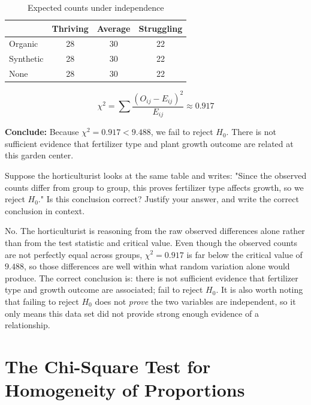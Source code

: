 \begin{Worked}
\begin{Solution}
\begin{table}[H]
\centering
\caption{Expected counts under independence}
\begin{tabular}{l|ccc}
 & Thriving & Average & Struggling \\
\hline
Organic   & 28 & 30 & 22 \\
Synthetic & 28 & 30 & 22 \\
None      & 28 & 30 & 22 \\
\end{tabular}
\end{table}

\[
\chi^2 = \sum \frac{(O_{ij}-E_{ij})^2}{E_{ij}} \approx 0.917
\]

\textbf{Conclude:} Because $\chi^2 = 0.917 < 9.488$, we fail to reject $H_0$. There is not sufficient evidence that fertilizer type and plant growth outcome are related at this garden center.
\end{Solution}
\end{Worked}

\begin{Exercise}[title={Spotting a misinterpretation}, label={ex:chisq-indep-fertilizer}]
Suppose the horticulturist looks at the same table and writes: "Since the observed counts differ from group to group, this proves fertilizer type affects growth, so we reject $H_0$." Is this conclusion correct? Justify your answer, and write the correct conclusion in context.
\end{Exercise}

\begin{Answer}[ref={ex:chisq-indep-fertilizer}]
No. The horticulturist is reasoning from the raw observed differences alone rather than from the test statistic and critical value. Even though the observed counts are not perfectly equal across groups, $\chi^2 = 0.917$ is far below the critical value of $9.488$, so those differences are well within what random variation alone would produce. The correct conclusion is: there is not sufficient evidence that fertilizer type and growth outcome are associated; fail to reject $H_0$. It is also worth noting that failing to reject $H_0$ does not \emph{prove} the two variables are independent, so it only means this data set did not provide strong enough evidence of a relationship.
\end{Answer}

\section{The Chi-Square Test for Homogeneity of Proportions}


